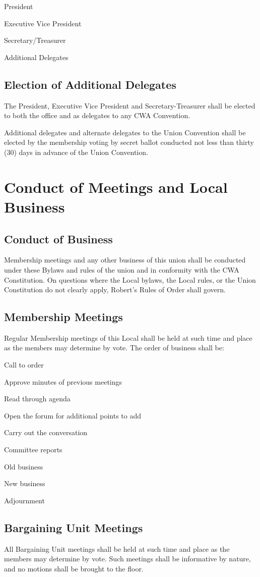 \documentclass[11pt]{article}
\newcommand{\article}[1]{\vspace{.75cm}\section{#1}}
\newcommand{\articlesection}[1]{\vspace{.25cm}\subsection{#1}}
\begin{document}
\begin{numberlist}
\item President
\item Executive Vice President
\item Secretary/Treasurer
\item Additional Delegates
\end{numberlist}

\articlesection{Election of Additional Delegates}
The President, Executive Vice President and Secretary-Treasurer shall be elected to both the office and as delegates to any CWA Convention.

Additional delegates and alternate delegates to the Union Convention shall be elected by
the membership voting by secret ballot conducted not less than thirty (30) days
in advance of the Union Convention.

\article{Conduct of Meetings and Local Business}\label{conduct-of-meetings}
\articlesection{Conduct of Business}
Membership meetings and any other business of this union shall be conducted under these Bylaws and rules of the union and in conformity with the CWA Constitution. On questions where the Local bylaws, the Local rules, or the Union Constitution do not clearly apply, Robert's Rules of Order shall govern.

\articlesection{Membership Meetings}
Regular Membership meetings of this Local shall be held at such time and place as the members may determine by vote. The order of business shall be:

\begin{numberlist}
\item Call to order
\item Approve minutes of previous meetings
\item Read through agenda
\item Open the forum for additional points to add
\item Carry out the conversation
\item Committee reports
\item Old business
\item New business
\item Adjournment
\end{numberlist}

\articlesection{Bargaining Unit Meetings}
All Bargaining Unit meetings shall be held at such time and place as the members may determine by vote. Such meetings shall be informative by nature, and no motions shall be brought to the floor.
\end{document}

